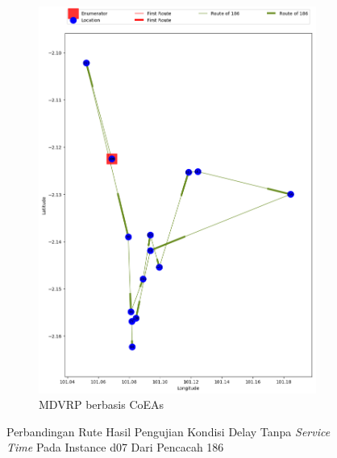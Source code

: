 \begin{figure}[H]
	\centering
	\begin{subfigure}[t]{\textwidth}
		\centering
		\includegraphics[width=\textwidth]{Resources/Images/delayed_7/real_m15_n100_delayed_7_186_coes}
		\caption{MDVRP berbasis CoEAs}
		\label{fig:real_m15_n100_delayed_7_186_coes}
	\end{subfigure}
	\caption{Perbandingan Rute Hasil Pengujian Kondisi Delay Tanpa \textit{Service Time} Pada Instance d07 Dari Pencacah 186}
	\label{fig:real_m15_n100_delayed_7_186}
\end{figure}


